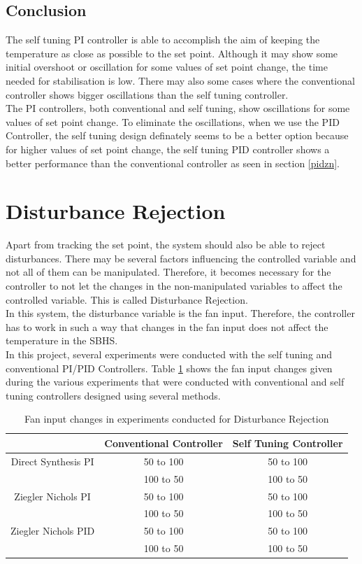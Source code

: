 \subsection{Conclusion}
The self tuning PI controller is able to accomplish the aim of keeping the temperature as close as possible to the 
set point. Although it may show some initial overshoot or oscillation for some values of set point change, the time 
needed for stabilisation is low. There may also some cases where the conventional controller shows bigger oscillations 
than the self tuning controller.\\
The PI controllers, both conventional and self tuning, show oscillations for some values of set point change. To eliminate 
the oscillations, when we use the PID Controller, the self tuning design definately seems to be a better option because for 
higher values of set point change, the self tuning PID controller shows a better performance than the conventional controller
as seen in section \ref{pidzn}.

\section{Disturbance Rejection}

Apart from tracking the set point, the system should also be able to reject disturbances. There may be several factors 
influencing the controlled variable and not all of them can be manipulated. Therefore, it becomes necessary for the 
controller to not let the changes in the non-manipulated variables to affect the controlled variable. This is called 
Disturbance Rejection.\\ In this system, the disturbance variable is the fan input. Therefore, the controller has to work in 
such a way that changes in the fan input does not affect the temperature in the SBHS.\\ In this project, several experiments 
were conducted with the self tuning and conventional PI/PID Controllers. Table \ref{dist} shows the fan input changes given 
during the various experiments that were conducted with conventional and self tuning controllers designed using several 
methods.\\
\begin{table}[h]
	\centering
		\begin{tabular}{||c|c|c|}\hline
			&Conventional Controller&Self Tuning Controller\\\hline \hline
		Direct Synthesis PI&50 to 100&50 to 100\\
											 &100 to 50&100 to 50\\\hline
		Ziegler Nichols PI &50 to 100&50 to 100\\
												&100 to 50&100 to 50 \\\hline
		Ziegler Nichols PID&50 to 100&50 to 100\\
												&100 to 50&100 to 50\\\hline
		\end{tabular}
	\caption{Fan input changes in experiments conducted for Disturbance Rejection}
	\label{dist}
\end{table}
